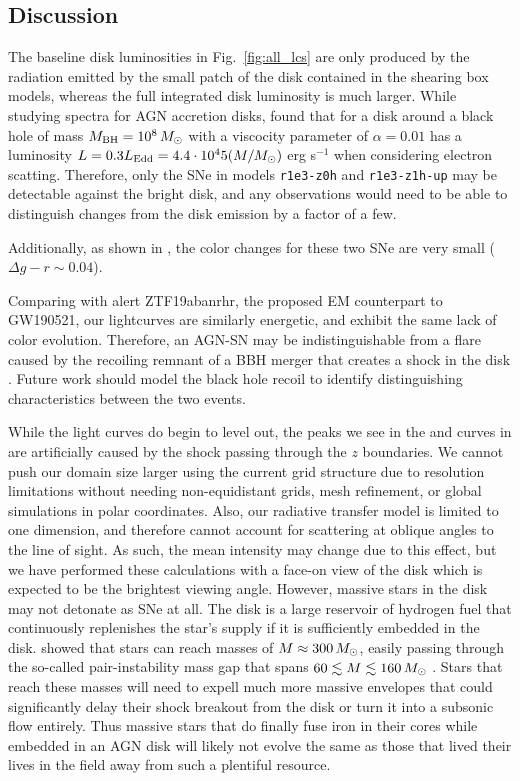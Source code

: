 \subsection{Discussion} \label{sec:discussion}

The baseline disk luminosities in Fig.~\ref{fig:all_lcs} are only produced by the radiation emitted by the small patch of the disk contained in the shearing box models, whereas the full integrated disk luminosity is much larger.
While studying spectra for AGN accretion disks, \citet{Hubeny+01} found that for a disk around a black hole of mass $M_{\rm BH}=10^8\,M_{\odot}$ with a viscocity parameter of $\alpha=0.01$ has a luminosity $L=0.3L_\text{Edd}=4.4\cdot10^45(M/M_{\odot})$ erg s$^{-1}$ when considering electron scatting.
Therefore, only the SNe in models \texttt{r1e3-z0h} and \texttt{r1e3-z1h-up} may be detectable against the bright disk, and any observations would need to be able to distinguish changes from the disk emission by a factor of a few.

Additionally, as shown in , the color changes for these two SNe are very small ($\Delta g-r \sim 0.04$).



Comparing with alert ZTF19abanrhr, the proposed EM counterpart to GW190521, our lightcurves are similarly energetic, and exhibit the same lack of color evolution.
Therefore, an AGN-SN may be indistinguishable from a flare caused by the recoiling remnant of a BBH merger that creates a shock in the disk \citep{McKernan+19}. 
Future work should model the black hole recoil to identify distinguishing characteristics between the two events.

While the light curves do begin to level out, the peaks we see in the  and  curves in  are artificially caused by the shock passing through the $z$ boundaries.
We cannot push our domain size larger using the current grid structure due to resolution limitations without needing non-equidistant grids,  mesh refinement, or global simulations in polar coordinates.
Also, our radiative transfer model is limited to one dimension, and therefore cannot account for scattering at oblique angles to the line of sight.
As such, the mean intensity may change due to this effect, but we have performed these calculations with a face-on view of the disk which is expected to be the brightest viewing angle.
However, massive stars in the disk may not detonate as SNe at all.
The disk is a large reservoir of hydrogen fuel that continuously replenishes the star's supply if it is sufficiently embedded in the disk.
\citet{CantielloJermynLin21} showed that stars can reach masses of $M\approx300\,M_{\odot}$, easily passing through the so-called pair-instability mass gap that spans $60\lesssim M \lesssim 160\,M_{\odot}$ \citep{WoosleyHeger21}.
Stars that reach these masses will need to expell much more massive envelopes that could significantly delay their shock breakout from the disk or turn it into a subsonic flow entirely.
Thus massive stars that do finally fuse iron in their cores while embedded in an AGN disk will likely not evolve the same as those that lived their lives in the field away from such a plentiful resource.


